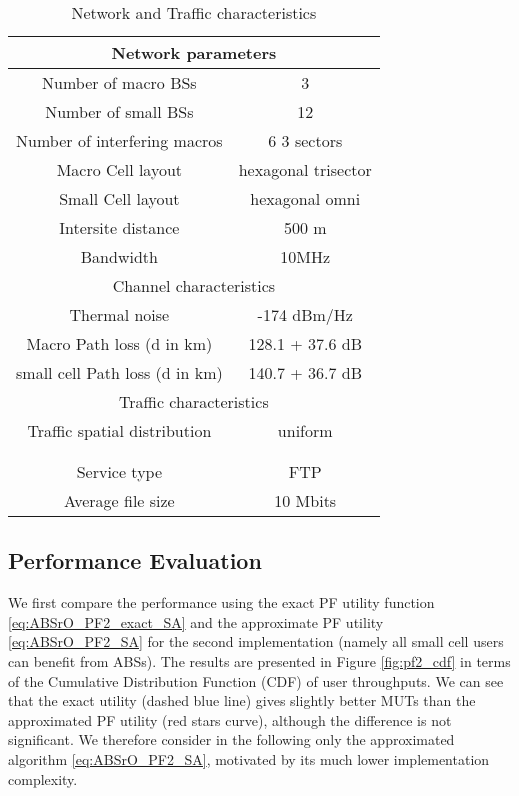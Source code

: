 \documentclass[conference]{IEEEtran}
\begin{document}
\begin{table}[!t]
\renewcommand{\arraystretch}{1.3}
\caption{Network and Traffic characteristics}
\label{tab:params}
\centering
\begin{tabular}{|c|c|}
\hline
\multicolumn{2}{|c|}{Network parameters} \\
\hline
Number of macro BSs & 3 \\
\hline
Number of small BSs & 12 \\
\hline
Number of interfering macros & 6  3 sectors \\
\hline
Macro Cell layout & hexagonal trisector \\
\hline
Small Cell layout & hexagonal omni \\
\hline
Intersite distance & 500 m \\
\hline
Bandwidth & 10MHz \\
\hline
\multicolumn{2}{|c|}{Channel characteristics} \\
\hline
Thermal noise & -174 dBm/Hz \\
\hline
Macro Path loss (d in km) & 128.1 + 37.6  dB \\
\hline
small cell Path loss (d in km) & 140.7 + 36.7  dB \\
\hline
\multicolumn{2}{|c|}{Traffic characteristics} \\
\hline
Traffic spatial distribution & uniform \\
\hline
 &  \\
\hline
 &  \\
\hline
Service type & FTP \\
\hline
Average file size & 10 Mbits \\
\hline
\end{tabular}
\end{table}
	
\subsection{Performance Evaluation}
	We first compare the performance using the exact PF utility function \eqref{eq:ABSrO_PF2_exact_SA} and the approximate PF utility \eqref{eq:ABSrO_PF2_SA} for the second implementation (namely all small cell users can benefit from \acp{ABS}). The results are presented in Figure \ref{fig:pf2_cdf} in terms of the Cumulative Distribution Function (CDF) of user throughputs. We can see that the exact utility (dashed blue line) gives slightly better \acp{MUT} than the approximated PF utility (red stars curve), although the difference is not significant. We therefore consider in the following only the approximated algorithm \eqref{eq:ABSrO_PF2_SA}, motivated by its much lower implementation complexity.
	
\end{document}
